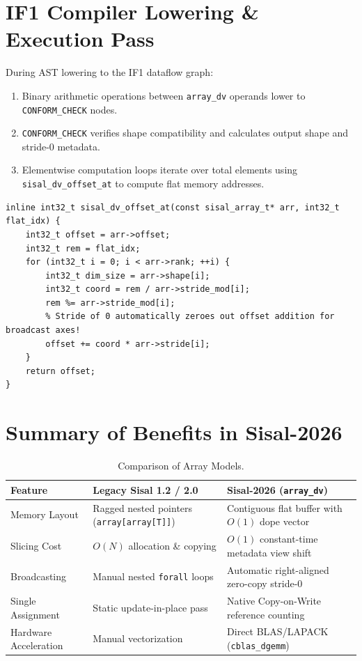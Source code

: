 \section{IF1 Compiler Lowering \& Execution Pass}
During AST lowering to the IF1 dataflow graph:
\begin{enumerate}
    \item Binary arithmetic operations between \texttt{array\_dv} operands lower to \texttt{CONFORM\_CHECK} nodes.
    \item \texttt{CONFORM\_CHECK} verifies shape compatibility and calculates output shape and stride-0 metadata.
    \item Elementwise computation loops iterate over total elements using \texttt{sisal\_dv\_offset\_at} to compute flat memory addresses.
\end{enumerate}

\begin{lstlisting}[caption={C++23 Runtime Stride-0 Index Calculation}]
inline int32_t sisal_dv_offset_at(const sisal_array_t* arr, int32_t flat_idx) {
    int32_t offset = arr->offset;
    int32_t rem = flat_idx;
    for (int32_t i = 0; i < arr->rank; ++i) {
        int32_t dim_size = arr->shape[i];
        int32_t coord = rem / arr->stride_mod[i];
        rem %= arr->stride_mod[i];
        % Stride of 0 automatically zeroes out offset addition for broadcast axes!
        offset += coord * arr->stride[i];
    }
    return offset;
}
\end{lstlisting}

\section{Summary of Benefits in Sisal-2026}
\begin{table}[h!]
\centering
\begin{tabularx}{\textwidth}{lXX}
\toprule
\textbf{Feature} & \textbf{Legacy Sisal 1.2 / 2.0} & \textbf{Sisal-2026 (\texttt{array\_dv})} \\
\midrule
Memory Layout & Ragged nested pointers (\texttt{array[array[T]]}) & Contiguous flat buffer with $O(1)$ dope vector \\
Slicing Cost & $O(N)$ allocation \& copying & $O(1)$ constant-time metadata view shift \\
Broadcasting & Manual nested \texttt{forall} loops & Automatic right-aligned zero-copy stride-0 \\
Single Assignment & Static update-in-place pass & Native Copy-on-Write reference counting \\
Hardware Acceleration & Manual vectorization & Direct BLAS/LAPACK (\texttt{cblas\_dgemm}) \\
\bottomrule
\end{tabularx}
\caption{Comparison of Array Models.}
\label{tab:array_comparison}
\end{table}
